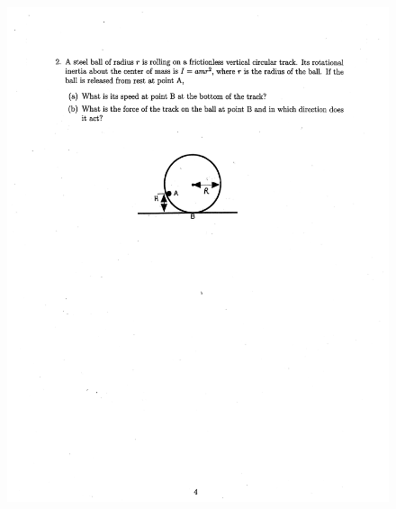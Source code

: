\documentclass[10pt,a4paper]{article}
\begin{document}
\begin{figure}[H]
 \centering
 \includegraphics[width=16cm]{pdf/1-1T43.png}
\end{figure}
 \newpage
\end{document}
